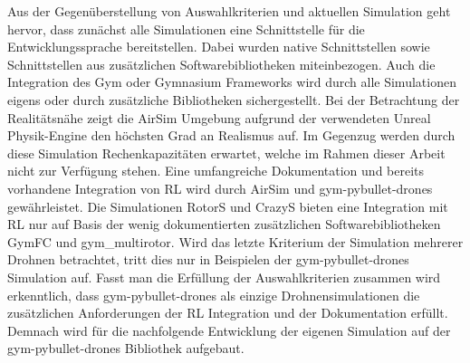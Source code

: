 Aus der Gegenüberstellung von Auswahlkriterien und aktuellen Simulation geht hervor, dass zunächst alle Simulationen eine Schnittstelle für die Entwicklungssprache bereitstellen.
Dabei wurden native Schnittstellen sowie Schnittstellen aus zusätzlichen Softwarebibliotheken miteinbezogen.
Auch die Integration des Gym oder Gymnasium Frameworks wird durch alle Simulationen eigens oder durch zusätzliche Bibliotheken sichergestellt.
Bei der Betrachtung der Realitätsnähe zeigt die AirSim Umgebung aufgrund der verwendeten Unreal Physik-Engine den höchsten Grad an Realismus auf.
Im Gegenzug werden durch diese Simulation Rechenkapazitäten erwartet, welche im Rahmen dieser Arbeit nicht zur Verfügung stehen.
Eine umfangreiche Dokumentation und bereits vorhandene Integration von RL wird durch AirSim und gym-pybullet-drones gewährleistet.
Die Simulationen RotorS und CrazyS bieten eine Integration mit RL nur auf Basis der wenig dokumentierten zusätzlichen Softwarebibliotheken GymFC und gym\_multirotor.
Wird das letzte Kriterium der Simulation mehrerer Drohnen betrachtet, tritt dies nur in Beispielen der gym-pybullet-drones Simulation auf.
Fasst man die Erfüllung der Auswahlkriterien zusammen wird erkenntlich, dass gym-pybullet-drones als einzige Drohnensimulationen die zusätzlichen Anforderungen der RL Integration und der Dokumentation erfüllt.
Demnach wird für die nachfolgende Entwicklung der eigenen Simulation auf der gym-pybullet-drones Bibliothek aufgebaut.

